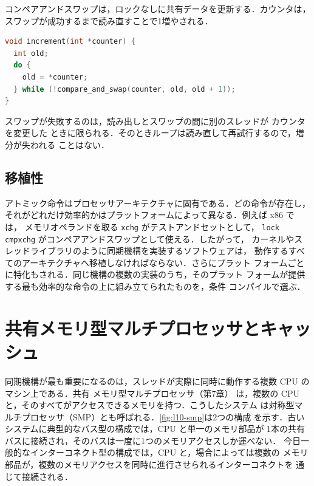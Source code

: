 \documentclass[../main.tex]{subfiles}
\begin{document}
\begin{example}
  コンペアアンドスワップは，ロックなしに共有データを更新する．カウンタは，
  スワップが成功するまで読み直すことで1増やされる．
  \begin{lstlisting}[language=C, numbers=none]
void increment(int *counter) {
  int old;
  do {
    old = *counter;
  } while (!compare_and_swap(counter, old, old + 1));
}
\end{lstlisting}
  スワップが失敗するのは，読み出しとスワップの間に別のスレッドが
  カウンタを変更した
  ときに限られる．そのときループは読み直して再試行するので，増分が失われる
  ことはない．
\end{example}

\subsection{移植性}

アトミック命令はプロセッサアーキテクチャに固有である．どの命令が存在し，
それがどれだけ効率的かはプラットフォームによって異なる．例えば x86 では，
メモリオペランドを取る \texttt{xchg} がテストアンドセットとして，
\texttt{lock cmpxchg} がコンペアアンドスワップとして使える．したがって，
カーネルやスレッドライブラリのように同期機構を実装するソフトウェアは，
動作するすべてのアーキテクチャへ移植しなければならない．さらにプラット
フォームごとに特化もされる．同じ機構の複数の実装のうち，そのプラット
フォームが提供する最も効率的な命令の上に組み立てられたものを，条件
コンパイルで選ぶ．

\section{共有メモリ型マルチプロセッサとキャッシュ}
\label{sec:l10-smp}

同期機構が最も重要になるのは，スレッドが実際に同時に動作する複数 CPU の
マシン上である．共有
メモリ型マルチプロセッサ（第7章）%
%
は，複数の CPU と，そのすべてがアクセスできるメモリを持つ．こうしたシステム
は対称型マルチプロセッサ（SMP）とも呼ばれる．\cref{fig:l10-smp}は2つの構成
を示す．古いシステムに典型的なバス型の構成では，CPU と単一のメモリ部品が
1本の共有バスに接続され，そのバスは一度に1つのメモリアクセスしか運べない．
今日一般的なインターコネクト型の構成では，CPU と，場合によっては複数の
メモリ部品が，複数のメモリアクセスを同時に進行させられるインターコネクトを
通じて接続される．
\end{document}
